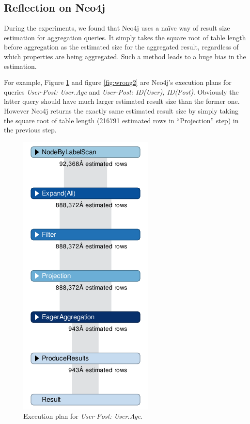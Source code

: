 \subsection{Reflection on Neo4j}
During the experiments, we found that Neo4j uses a na\"ive way of result size estimation for aggregation queries. It simply takes the square root of table length before aggregation as the estimated size for the aggregated result, regardless of which properties are being aggregated. Such a method leads to a huge bias in the estimation. 

For example, Figure \ref{fig:wrong1} and figure \ref{fig:wrong2} are Neo4j's execution plans for queries \textit{User-Post: User.Age} and \textit{User-Post: ID(User), ID(Post)}. Obviously the latter query should have much larger estimated result size than the former one. However Neo4j returns the exactly same estimated result size by simply taking the square root of table length (216791 estimated rows in ``Projection'' step) in the previous step.


\begin{figure}[H]
	\centering
	\includegraphics[scale=0.7]{"pic/wrong"}
	\caption{Execution plan for \textit{User-Post: User.Age}.}
	\label{fig:wrong1}
\end{figure}

